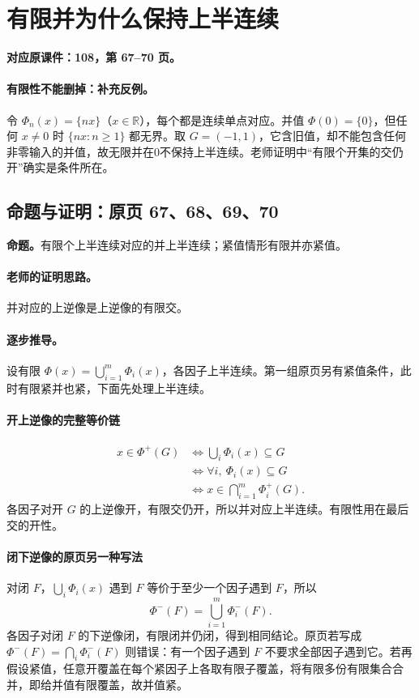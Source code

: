 \documentclass[11pt,a4paper]{article}
\newcommand{\R}{\mathbb{R}}\newcommand{\N}{\mathbb{N}}
\theoremstyle{definition}\newtheorem{definition}{定义}\newtheorem{example}{例}
\begin{document}
\clearpage\section{有限并为什么保持上半连续}\label{g:108:67}

\textbf{对应原课件：108，第 67--70 页。}


\paragraph{有限性不能删掉：补充反例。}
令 $\Phi_n(x)=\{nx\}$（$x\in\R$），每个都是连续单点对应。并值 $\Phi(0)=\{0\}$，但任何 $x\ne0$ 时 $\{nx:n\ge1\}$ 都无界。取 $G=(-1,1)$，它含旧值，却不能包含任何非零输入的并值，故无限并在0不保持上半连续。老师证明中“有限个开集的交仍开”确实是条件所在。


\subsection{命题与证明：原页 67、68、69、70}

\textbf{命题。}有限个上半连续对应的并上半连续；紧值情形有限并亦紧值。

\paragraph{老师的证明思路。}并对应的上逆像是上逆像的有限交。

\paragraph{逐步推导。}
设有限 $\Phi(x)=\bigcup_{i=1}^m\Phi_i(x)$，各因子上半连续。第一组原页另有紧值条件，此时有限紧并也紧，下面先处理上半连续。
\paragraph{开上逆像的完整等价链}
\begin{align*}
x\in\Phi^+(G)&\iff\bigcup_i\Phi_i(x)\subseteq G\\
&\iff\forall i,\ \Phi_i(x)\subseteq G\\
&\iff x\in\bigcap_{i=1}^m\Phi_i^+(G).
\end{align*}
各因子对开 $G$ 的上逆像开，有限交仍开，所以并对应上半连续。有限性用在最后交的开性。
\paragraph{闭下逆像的原页另一种写法}
对闭 $F$，$\bigcup_i\Phi_i(x)$ 遇到 $F$ 等价于至少一个因子遇到 $F$，所以
\[\Phi^-(F)=\bigcup_{i=1}^m\Phi_i^-(F).\]
各因子对闭 $F$ 的下逆像闭，有限闭并仍闭，得到相同结论。原页若写成 $\Phi^-(F)=\bigcap_i\Phi_i^-(F)$ 则错误：有一个因子遇到 $F$ 不要求全部因子遇到它。若再假设紧值，任意开覆盖在每个紧因子上各取有限子覆盖，将有限多份有限集合合并，即给并值有限覆盖，故并值紧。
\end{document}

